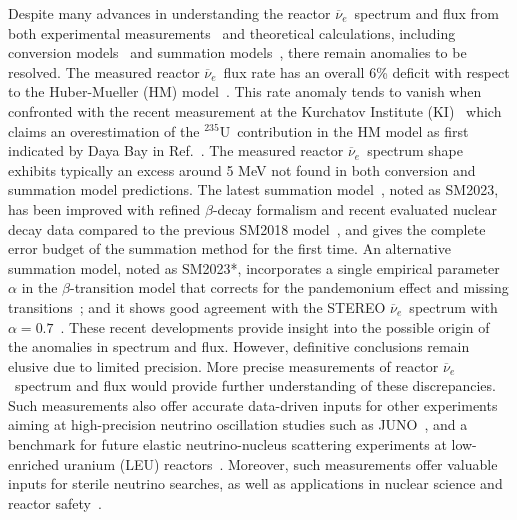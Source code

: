 \documentclass[aps,prl,showpacs,showkeys,amsmath,amssymb,twocolumn,floatfix,superscriptaddress,nofootinbib]{revtex4-1}
\newcommand{\Rnu}{$\overline{\nu}_e$}
\newcommand{\Ufive}{$\mathrm{^{235}U}$}
\begin{document}
Despite many advances in understanding the reactor \Rnu\ spectrum and flux from both experimental measurements~\cite{Gosgen1986, Rovno1991, Bugey4, SRP1996, Krasn1999, Palo_Verde2001, CHOOZ2002,  Nucifer2016, DayaBay_flux_spec_2015, DayaBay_PRL_evolution2017, DayaBay_PRL_extraction, DayaBay_PRL_evolution2023, DoubleChooz_NaturePhys, RENO_flux_spec_2021, PROSPECT_final, Stereo_Nature, DANSS_2023, DANSS_Neutrino2024, NEOSII_Neutrino2024}
and theoretical calculations, including conversion models~\cite{model_Huber, model_Mueller, Exp_U238, model_KI} and summation models~\cite{model_SM2018, model_SM2023_PRC, model_SM2023_PRL},
there remain anomalies to be resolved.
The measured reactor \Rnu\ flux rate has an overall 6\% deficit with respect to the Huber-Mueller (HM) model~\cite{RAA,RAA_review2022,RAA_review2024}.
This rate anomaly tends to vanish when confronted with the recent measurement at the Kurchatov Institute (KI)~\cite{model_KI} which claims an overestimation of the \Ufive\ contribution in the HM model as first indicated by Daya Bay in Ref.~\cite{DayaBay_PRL_evolution2017}.
The measured reactor \Rnu\ spectrum shape exhibits typically an excess around 5 MeV
not found in both conversion and summation model predictions.
The latest summation model~\cite{model_SM2023_PRC}, noted as SM2023, has been improved with refined $\beta$-decay formalism and recent evaluated nuclear decay data compared to the previous SM2018 model~\cite{model_SM2018}, and gives the complete error budget of the summation method for the first time.
An alternative summation model, noted as SM2023*, incorporates a single empirical parameter $\alpha$ in the $\beta$-transition model that corrects for the pandemonium effect and missing transitions~\cite{model_SM2023_PRC}; and it shows good agreement with the STEREO \Rnu\ spectrum with $\alpha=0.7$~\cite{Stereo_Nature}.
These recent developments provide insight into the possible origin of the anomalies in spectrum and flux.
However, definitive conclusions remain elusive due to limited precision.
More precise measurements of reactor \Rnu\ spectrum and flux would provide further understanding of these discrepancies.
Such measurements also offer accurate data-driven inputs for other experiments aiming at high-precision neutrino oscillation studies such as JUNO~\cite{JUNO_YB, JUNO2021, JUNO_NMO, JUNOprecision}, and a benchmark for future elastic neutrino-nucleus scattering experiments at low-enriched uranium (LEU) reactors~\cite{Snowmass_Rnu}.
Moreover, such measurements offer valuable inputs for sterile neutrino searches, as well as applications in nuclear science and reactor safety~\cite{Snowmass_Rnu, NuclearSafety}.
\end{document}
